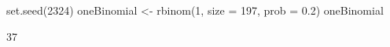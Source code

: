 \begin{Schunk}
\begin{Sinput}
  set.seed(2324)
  oneBinomial <- rbinom(1, size = 197, prob = 0.2)
  oneBinomial
\end{Sinput}
\begin{Soutput}
[1] 37
\end{Soutput}
\end{Schunk}

